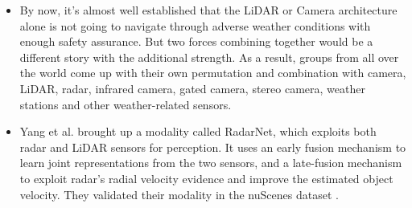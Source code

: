 \documentclass[rnd]{mas_proposal}
\begin{document}
\begin{itemize}


    \item By now, it’s almost well established that the LiDAR or Camera architecture alone is not going to navigate through adverse weather conditions with enough safety assurance. But two forces combining together would be a different story with the additional strength. As a result, groups from all over the world come up with their own permutation and combination with camera, LiDAR, radar, infrared camera, gated camera, stereo camera, weather stations and other weather-related sensors.

    \item Yang et al. \cite{yang2020radarnet} brought up a modality called RadarNet, which exploits both radar and LiDAR sensors for perception. It uses an early fusion mechanism to learn joint representations from the two sensors, and a late-fusion mechanism to exploit radar’s radial velocity evidence and improve the estimated object velocity. They validated their modality in the nuScenes dataset \cite{caesar2020nuscenes}.


\end{itemize}
\end{document}
